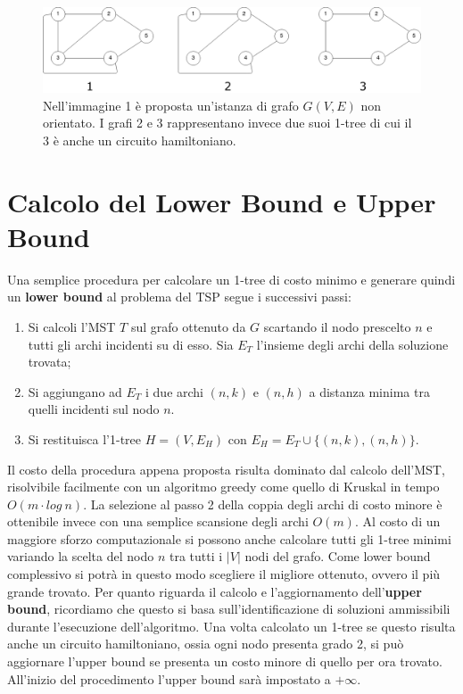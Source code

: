 \documentclass[
	article,			%
	12pt,				%
	oneside,			%
	a4paper,			%
	english,			%
	italian,				%
	sumario=tradicional,
	]{abntex2}
\begin{document}
\newpage
\begin{figure}
    \centering
    \includegraphics[scale=0.35]{files/1TreeEsempi.png}
    \caption{Nell'immagine 1 è proposta un'istanza di grafo $G(V,E)$ non orientato. I grafi 2 e 3 rappresentano invece due suoi 1-tree di cui il 3 è anche un circuito hamiltoniano.}
\end{figure}

\section{Calcolo del Lower Bound e Upper Bound}
Una semplice procedura per calcolare un 1-tree di costo minimo e generare quindi un \textbf{lower bound} al problema del TSP segue i successivi passi:
\begin{enumerate}
    \item Si calcoli l'MST $T$ sul grafo ottenuto da $G$ scartando il nodo prescelto $n$ e tutti gli archi incidenti su di esso. Sia $E_T$ l'insieme degli archi della soluzione trovata;
    \item Si aggiungano ad $E_T$ i due archi $(n,k)$ e $(n,h)$ a distanza minima tra quelli incidenti sul nodo $n$.
    \item Si restituisca l'1-tree $H = (V, E_H)$ con $E_H = E_T \cup \{(n,k),(n,h)\}$.
\end{enumerate}
Il costo della procedura appena proposta risulta dominato dal calcolo dell'MST, risolvibile facilmente con un algoritmo greedy come quello di  Kruskal in tempo $O(m\cdot log\: n)$. La selezione al passo 2 della coppia degli archi di costo minore è ottenibile invece con una semplice scansione degli archi $O(m)$.
\newline
Al costo di un maggiore sforzo computazionale si possono anche calcolare tutti gli 1-tree minimi variando la scelta del nodo $n$ tra tutti i $|V|$ nodi del grafo. Come lower bound complessivo si potrà in questo modo scegliere il migliore ottenuto, ovvero il più grande trovato.
\newline
Per quanto riguarda il calcolo e l'aggiornamento dell'\textbf{upper bound}, ricordiamo che questo si basa sull'identificazione di soluzioni ammissibili durante l'esecuzione dell'algoritmo. Una volta calcolato un 1-tree se questo risulta anche un circuito hamiltoniano, ossia ogni nodo presenta grado 2, si può aggiornare l'upper bound se presenta un costo minore di quello per ora trovato. All'inizio del procedimento l'upper bound sarà impostato a $ + \infty$. 
\end{document}
